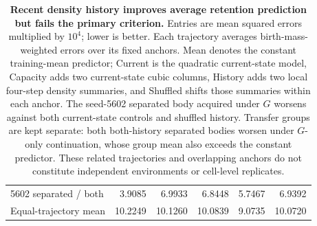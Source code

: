 \begin{table}[p]
\begin{tabular}{lrrrrr}
5602 separated / both & 3.9085 & 6.9933 & 6.8448 & 5.7467 & 6.9392 \\
Equal-trajectory mean & 10.2249 & 10.1260 & 10.0839 & 9.0735 & 10.0720 \\
\bottomrule
\end{tabular}
\caption{\textbf{Recent density history improves average retention prediction but fails the primary criterion.} Entries are mean squared errors multiplied by $10^4$; lower is better. Each trajectory averages birth-mass-weighted errors over its fixed anchors. Mean denotes the constant training-mean predictor; Current is the quadratic current-state model, Capacity adds two current-state cubic columns, History adds two local four-step density summaries, and Shuffled shifts those summaries within each anchor. The seed-5602 separated body acquired under $G$ worsens against both current-state controls and shuffled history. Transfer groups are kept separate: both both-history separated bodies worsen under $G$-only continuation, whose group mean also exceeds the constant predictor. These related trajectories and overlapping anchors do not constitute independent environments or cell-level replicates.}
\label{tab:history-retention-forecast}
\end{table}
